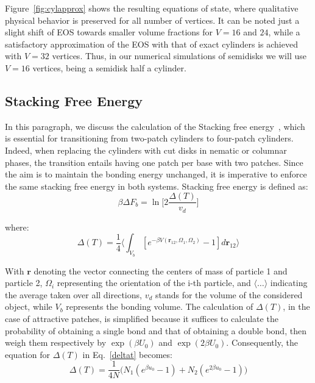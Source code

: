 \documentclass[aip,jcp, amsmath, amssymb, reprint]{revtex4-1}
\begin{document}
Figure~\ref{fig:cylapprox} shows the resulting equations of state, where qualitative physical behavior is preserved for
all number of vertices. It can be noted just a slight shift of EOS towards smaller volume fractions for $V= 16$ and $24$,
while a satisfactory approximation of the EOS with that of exact cylinders is achieved with $V=32$ vertices. 
Thus, in our numerical simulations of semidisks we will use $V=16$ vertices, being a semidisk half a cylinder. 

\subsection{Stacking Free Energy}

In this paragraph, we discuss the calculation of the Stacking free energy~\cite{DeMichele12}, which is essential for
transitioning from two-patch cylinders to four-patch cylinders. Indeed, when replacing the cylinders with cut disks in
nematic or columnar phases, the transition entails having one patch per base with two patches. Since the aim is to
maintain the bonding energy unchanged, it is imperative to enforce the same stacking free energy in both systems.
Stacking free energy is defined as:
\begin{equation}
	\beta\Delta F_b=\ln \bigg[2\frac{\Delta(T)}{v_d}\bigg]
	\label{deltaf}
\end{equation}

where:
\begin{equation}
\label{deltat}
	\Delta(T)=\frac{1}{4}\bigg\langle \int_{V_b} [e^{-\beta V(\textbf{r}_{12}, \Omega_1, \Omega_2)}-1]d\textbf{r}_{12}\bigg\rangle
\end{equation}

With $\textbf{r}$ denoting the vector connecting the centers of mass of particle 1 and particle 2, $\Omega_i$
representing the orientation of the i-th particle, and $\langle\ldots\rangle$ indicating the average taken over all
directions, $v_d$ stands for the volume of the considered object, while $V_b$ represents the bonding volume. The
calculation of $\Delta (T)$, in the case of attractive patches, is simplified because it suffices to calculate the
probability of obtaining a single bond and that of obtaining a double bond, then weigh them respectively by $\exp(\beta
U_0)$ and $\exp(2\beta U_0)$. Consequently, the equation for $\Delta (T)$ in Eq.~\eqref{deltat} becomes:
\begin{equation}
\label{deltat2}
	\Delta(T)=\frac{1}{4N}\big( N_1(e^{\beta u_0}-1)+N_2(e^{2\beta u_0}-1)\big)
\end{equation}
\end{document}
